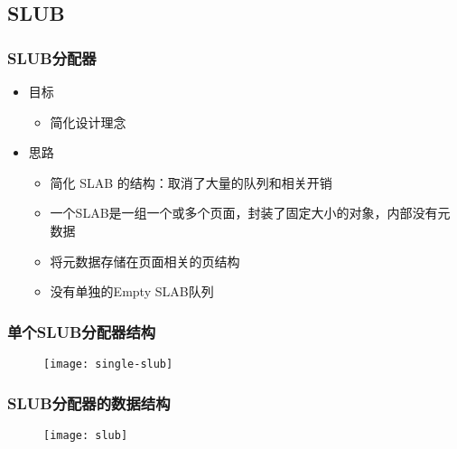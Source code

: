 \subsection{SLUB} %
\begin{frame}[plain,t]    
    \frametitle{SLUB分配器}

    \begin{itemize}
        \item 目标

        \begin{itemize}
            \item 简化设计理念
        \end{itemize}\pause
        \item 思路

        \begin{itemize}
            \item 简化 SLAB 的结构：取消了大量的队列和相关开销
            \item 一个SLAB是一组一个或多个页面，封装了固定大小的对象，内部没有元数据
            \item 将元数据存储在页面相关的页结构
            \item 没有单独的Empty SLAB队列
        \end{itemize}
    \end{itemize}
\end{frame}
\begin{frame}[plain,t]    
    \frametitle{单个SLUB分配器结构}
    \begin{figure}
        \centering
        \texttt{[image: single-slub]}
    \end{figure}
\end{frame}
\begin{frame}[plain,t]    
    \frametitle{SLUB分配器的数据结构}
    \begin{figure}
        \centering
        \texttt{[image: slub]}
    \end{figure}
\end{frame}


